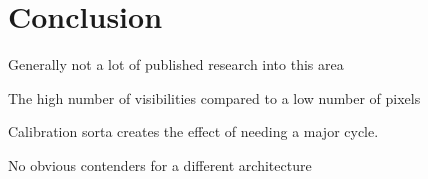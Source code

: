 \section{Conclusion}


Generally not a lot of published research into this area

The high number of visibilities compared to a low number of pixels 

Calibration sorta creates the effect of needing a major cycle.

No obvious contenders for a different architecture





